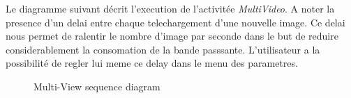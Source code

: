 Le diagramme suivant décrit l'execution de l'activitée \textit{MultiVideo}. A
noter la presence d'un delai entre chaque telechargement d'une nouvelle image.
Ce delai nous permet de ralentir le nombre d'image par seconde dans le but de reduire considerablement la consomation de la bande passsante.
L'utilisateur a la possibilité de regler lui meme ce delay dans le menu des
parametres.
 \begin{figure}[H]
  \label{DiagrammeSequenceMultiView}
  \centering
  \caption{Multi-View sequence diagram}
\end{figure}  


